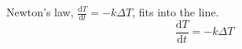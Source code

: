 Newton's law, $\frac{\mathrm{d}T}{\mathrm{d}t} = -k \Delta T$, fits into the line.
\[
    \frac{\mathrm{d}T}{\mathrm{d}t} = -k \Delta T
\]
